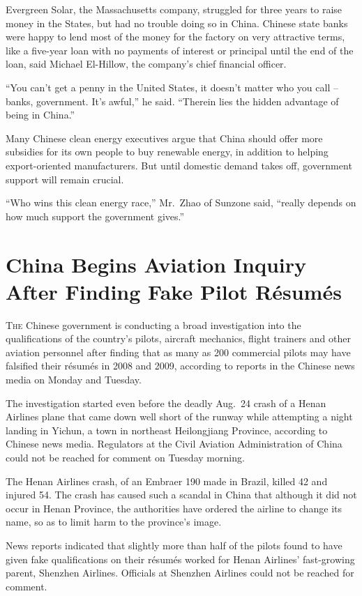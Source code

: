 ﻿\documentclass[12pt]{article}
\begin{document}
Evergreen Solar, the Massachusetts company, struggled for three years to raise money in the States,
but had no trouble doing so in China. Chinese state banks were happy to lend most of the money for
the factory on very attractive terms, like a five-year loan with no payments of interest or
principal until the end of the loan, said Michael El-Hillow, the company's chief financial officer.

``You can't get a penny in the United States, it doesn't matter who you call -- banks, government.
It's awful,'' he said. ``Therein lies the hidden advantage of being in China.''

Many Chinese clean energy executives argue that China should offer more subsidies for its own people
to buy renewable energy, in addition to helping export-oriented manufacturers. But until domestic
demand takes off, government support will remain crucial.

``Who wins this clean energy race,'' Mr.~Zhao of Sunzone said, ``really depends on how much support
the government gives.''

\pagebreak
\section{China Begins Aviation Inquiry After Finding Fake Pilot R\'esum\'es}

\lettrine{T}{he} Chinese government is conducting a broad investigation
into the qualifications of the country's pilots, aircraft mechanics, flight trainers and other
aviation personnel after finding that as many as 200 commercial pilots may have falsified their
r\'esum\'es in 2008 and 2009, according to reports in the Chinese news media on Monday and Tuesday.

The investigation started even before the deadly Aug.~24 crash of a Henan Airlines plane that came
down well short of the runway while attempting a night landing in Yichun, a town in northeast
Heilongjiang Province, according to Chinese news media. Regulators at the Civil Aviation
Administration of China could not be reached for comment on Tuesday morning.

The Henan Airlines crash, of an Embraer 190 made in Brazil, killed 42 and injured 54. The crash has
caused such a scandal in China that although it did not occur in Henan Province, the authorities
have ordered the airline to change its name, so as to limit harm to the province's image.

News reports indicated that slightly more than half of the pilots found to have given fake
qualifications on their r\'esum\'es worked for Henan Airlines' fast-growing parent, Shenzhen
Airlines. Officials at Shenzhen Airlines could not be reached for comment.
\end{document}
